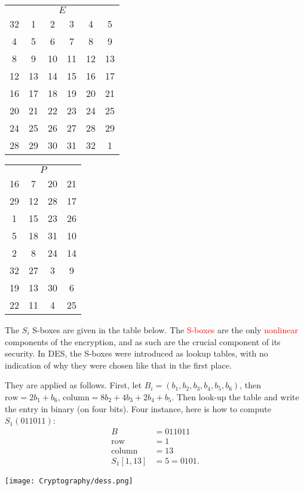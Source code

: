 \documentclass[a4paper, 11pt, openany]{book}
\numberwithin{equation}{section}
\theoremstyle{plain}
\theoremstyle{definition}
\newcommand{\Important}[1]{\textcolor{red}{#1}}
\begin{document}
\begin{tabular}{cccccc}
\multicolumn{6}{c}{$E$}\\
32 & 1 & 2 & 3 & 4 & 5\\
4 & 5 & 6 & 7 & 8 & 9\\
8 & 9 & 10 & 11 & 12 & 13\\
12 & 13 & 14 & 15 & 16 & 17\\
16 & 17 & 18 & 19 & 20 & 21\\
20 & 21 & 22 & 23 & 24 & 25\\
24 & 25 & 26 & 27 & 28 & 29\\
28 & 29 & 30 & 31 & 32 & 1
\end{tabular}
\hfill
\begin{tabular}{cccc}
\multicolumn{4}{c}{$P$}\\
16 & 7 & 20 & 21\\
29 & 12 & 28 & 17\\
1 & 15 & 23 & 26\\
5 & 18 & 31 & 10\\
2 & 8 & 24 & 14\\
32 & 27 & 3 & 9\\
19 & 13 & 30 & 6\\
22 & 11 & 4 & 25
\end{tabular}

The $S_i$ S-boxes are given in the table below. The \Important{S-boxes} are the only \Important{nonlinear} components of the encryption, and as such are the crucial component of its security. In DES, the S-boxes were introduced as lookup tables, with no indication of why they were chosen like that in the first place.

They are applied as follows. First, let $B_i = (b_1, b_2, b_3, b_4, b_5, b_6)$, then $\text{row} = 2b_1 + b_6$, $\text{column} = 8b_2 + 4b_3 + 2b_4 + b_5$. Then look-up the table and write the entry in binary (on four bits). Four instance, here is how to compute $S_1(011011)$:
\begin{align*}
    B &= 011011\\
    \text{row} &= 1\\
    \text{column} &= 13\\
    S_1[1,13] &= 5 = 0101.
\end{align*}

\begin{center}
    \texttt{[image: Cryptography/dess.png]}
\end{center}
\end{document}
